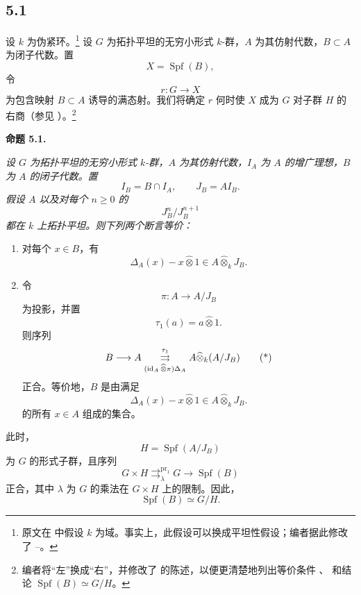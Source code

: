 
\subsection*{5.1}
\label{sga3:VIIB:5.1}

设 \(k\) 为伪紧环。\footnote{%
\label{sga3:VIIB:nde:143}原文在  中假设 \(k\) 为域。事实上，此假设可以换成平坦性假设；编者据此修改了 --。}
设 \(G\) 为拓扑平坦的无穷小形式 \(k\)-群，\(A\) 为其仿射代数，\(B\subset A\) 为闭子代数。置
\[
  X=\operatorname{Spf}(B),
\]
令
\[
  r:G\longrightarrow X
\]
为包含映射 \(B\subset A\) 诱导的满态射。我们将确定 \(r\) 何时使 \(X\) 成为 \(G\) 对子群 \(H\) 的右商\textup{（参见 ）}。\footnote{%
\label{sga3:VIIB:nde:144}编者将“左”换成“右”，并修改了  的陈述，以便更清楚地列出等价条件 \textup{}、\textup{} 和结论 \(\operatorname{Spf}(B)\simeq G/H\)。}

\medskip
\noindent\textbf{命题 5.1.}
\label{sga3:VIIB:5.1:proposition}
{\itshape 设 \(G\) 为拓扑平坦的无穷小形式 \(k\)-群，\(A\) 为其仿射代数，\(I_A\) 为 \(A\) 的增广理想，\(B\) 为 \(A\) 的闭子代数。置
\[
  I_B=B\cap I_A,
  \qquad
  J_B=AI_B.
\]
假设 \(A\) 以及对每个 \(n\geq0\) 的
\[
  J_B^n/J_B^{n+1}
\]
都在 \(k\) 上拓扑平坦。则下列两个断言等价：
\begin{enumerate}
\item[\textup{(i)}] 对每个 \(x\in B\)，有
\[
  \Delta_A(x)-x\widehat\otimes1
  \in
  A\widehat\otimes_kJ_B.
\]

\item[\textup{\SGAInlineRefTarget{sga3:VIIB:5.1:proposition:item:ii}(ii)}] 令
\[
  \pi:A\longrightarrow A/J_B
\]
为投影，并置
\[
  \tau_1(a)=a\widehat\otimes1.
\]
则序列
\[
  B\longrightarrow A
  \mathrel{\mathop{\rightrightarrows}^{\tau_1}_{%
    (\operatorname{id}_A\widehat\otimes\pi)\Delta_A}}
  A\widehat\otimes_k(A/J_B)
  \tag{*}\label{sga3:vii:proposition:5-1:equation:star}
\]
正合。等价地，\(B\) 是由满足
\[
  \Delta_A(x)-x\widehat\otimes1
  \in
  A\widehat\otimes_kJ_B.
\]
的所有 \(x\in A\) 组成的集合。
\end{enumerate}
此时，
\[
  H=\operatorname{Spf}(A/J_B)
\]
为 \(G\) 的形式子群，且序列
\[
  G\times H
  \mathrel{\mathop{\rightrightarrows}^{\operatorname{pr}_1}_{\lambda}}
  G
  \longrightarrow
  \operatorname{Spf}(B)
  \tag{**}\label{sga3:vii:proposition:5-1:equation:double-star}
\]
正合，其中 \(\lambda\) 为 \(G\) 的乘法在 \(G\times H\) 上的限制。因此，
\[
  \operatorname{Spf}(B)\simeq G/H.
\]}

